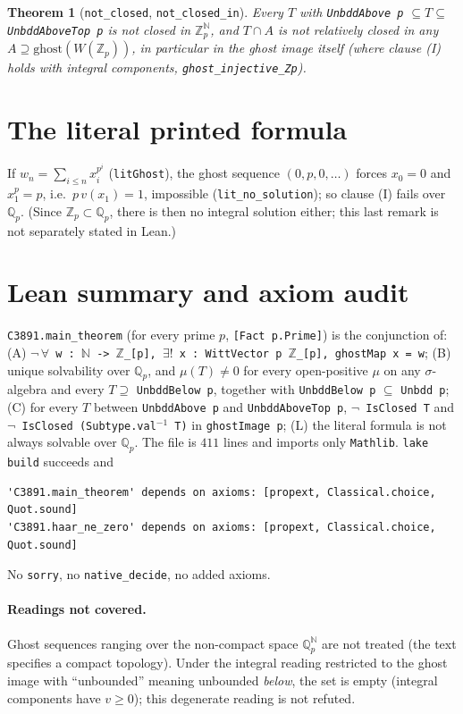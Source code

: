 \documentclass[11pt]{article}
\newtheorem{theorem}{Theorem}
\theoremstyle{definition}
\newcommand{\Zp}{\mathbb{Z}_p}
\newcommand{\Qp}{\mathbb{Q}_p}
\newcommand{\lean}[1]{\texttt{#1}}
\begin{document}
\begin{theorem}[\lean{not\_closed}, \lean{not\_closed\_in}]
Every $T$ with \lean{UnbddAbove p} $\subseteq T\subseteq$ \lean{UnbddAboveTop p} is not closed in $\Zp^{\mathbb N}$,
and $T\cap A$ is not relatively closed in any $A\supseteq\mathrm{ghost}(W(\Zp))$, in particular in the ghost image
itself (where clause (I) holds with integral components, \lean{ghost\_injective\_Zp}).
\end{theorem}

\section{The literal printed formula}

If $w_n=\sum_{i\le n}x_i^{p^i}$ (\lean{litGhost}), the ghost sequence $(0,p,0,\dots)$ forces $x_0=0$ and
$x_1^p=p$, i.e.\ $p\,v(x_1)=1$, impossible (\lean{lit\_no\_solution}); so clause (I) fails over $\Qp$. (Since $\Zp\subset\Qp$, there is
then no integral solution either; this last remark is not separately stated in Lean.)

\section{Lean summary and axiom audit}

\lean{C3891.main\_theorem} (for every prime $p$, \lean{[Fact p.Prime]}) is the conjunction of:
(A) \lean{$\neg\,\forall$ w : $\mathbb N$ -> $\mathbb Z$\_[p], $\exists!$ x : WittVector p $\mathbb Z$\_[p], ghostMap x = w};
(B) unique solvability over $\Qp$, and $\mu(T)\ne0$ for every open-positive $\mu$ on any $\sigma$-algebra and
every $T\supseteq$ \lean{UnbddBelow p}, together with \lean{UnbddBelow p} $\subseteq$ \lean{Unbdd p};
(C) for every $T$ between \lean{UnbddAbove p} and \lean{UnbddAboveTop p}, \lean{$\neg$ IsClosed T} and
\lean{$\neg$ IsClosed (Subtype.val$^{-1}$ T)} in \lean{ghostImage p};
(L) the literal formula is not always solvable over $\Qp$.
The file is $411$ lines and imports only \lean{Mathlib}. \lean{lake build} succeeds and
\begin{verbatim}
'C3891.main_theorem' depends on axioms: [propext, Classical.choice, Quot.sound]
'C3891.haar_ne_zero' depends on axioms: [propext, Classical.choice, Quot.sound]
\end{verbatim}
No \lean{sorry}, no \lean{native\_decide}, no added axioms.

\paragraph{Readings not covered.} Ghost sequences ranging over the non-compact space $\Qp^{\mathbb N}$ are not
treated (the text specifies a compact topology). Under the integral reading restricted to the ghost image with
``unbounded'' meaning unbounded \emph{below}, the set is empty (integral components have $v\ge0$); this
degenerate reading is not refuted.
\end{document}
